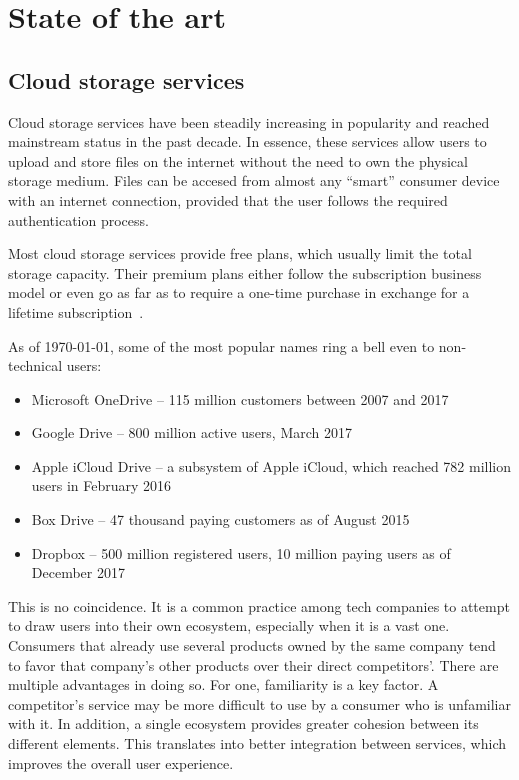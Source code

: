 \chapter{State of the art}

\section{Cloud storage services} \label{cloud_storage_services}

Cloud storage services have been steadily increasing in popularity and reached mainstream status in the past decade. In essence, these services allow users to upload and store files on the internet without the need to own the physical storage medium. Files can be accesed from almost any ``smart'' consumer device with an internet connection, provided that the user follows the required authentication process.

Most cloud storage services provide free plans, which usually limit the total storage capacity. Their premium plans either follow the subscription business model or even go as far as to require a one-time purchase in exchange for a lifetime subscription~\cite{get_3tb_of_lifetime_cloud_storage}.

As of \monthyeardate\today, some of the most popular names ring a bell even to non-technical users:
\begin{itemize} \label{lst:cloud_storage_services}
\itemsep0em
\item Microsoft OneDrive -- 115 million customers between 2007 and 2017~\cite{10_years_of_onedrive}
\item Google Drive -- 800 million active users, March 2017~\cite{google_plans_to_leverage,google_updates_drive_focus_on_business}
\item Apple iCloud Drive -- a subsystem of Apple iCloud, which reached 782 million users in February 2016~\cite{icloud_hits_782m_users}
\item Box Drive -- 47 thousand paying customers as of August 2015~\cite{box_hires_nasdaq_exec}
\item Dropbox -- 500 million registered users, 10 million paying users as of December 2017~\cite{dropbox_inc_registration_statement}
\end{itemize}

This is no coincidence. It is a common practice among tech companies to attempt to draw users into their own ecosystem, especially when it is a vast one. Consumers that already use several products owned by the same company tend to favor that company's other products over their direct competitors'. There are multiple advantages in doing so. For one, familiarity is a key factor. A competitor's service may be more difficult to use by a consumer who is unfamiliar with it. In addition, a single ecosystem provides greater cohesion between its different elements. This translates into better integration between services, which improves the overall user experience.

